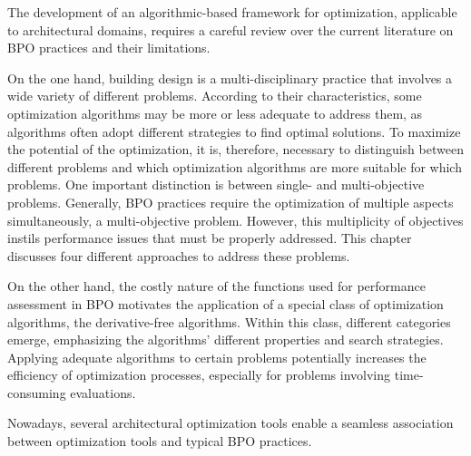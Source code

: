 \cleardoublepage
\label{chap:back}



	The development of an algorithmic-based framework for optimization, applicable to architectural domains, requires a careful review over the current literature on \ac{BPO} practices and their limitations. 
	
	On the one hand, building design is a multi-disciplinary practice that involves a wide variety of different problems. According to their characteristics, some optimization algorithms may be more or less adequate to address them, as algorithms often adopt different strategies to find optimal solutions. To maximize the potential of the optimization, it is, therefore, necessary to distinguish between different problems and which optimization algorithms are more suitable for which problems. One important distinction is between single- and multi-objective problems. Generally, \ac{BPO} practices require the optimization of multiple aspects simultaneously, a multi-objective problem. However, this multiplicity of objectives instils performance issues that must be properly addressed. This chapter discusses four different approaches to address these problems.
	
	On the other hand, the costly nature of the functions used for performance assessment in \ac{BPO} motivates the application of a special class of optimization algorithms, the derivative-free algorithms. Within this class, different categories emerge, emphasizing the algorithms' different properties and search strategies. Applying adequate algorithms to certain problems potentially increases the efficiency of optimization processes, especially for problems involving time-consuming evaluations.
	
	Nowadays, several architectural optimization tools enable a seamless association between optimization tools and typical \ac{BPO} practices. %
	
